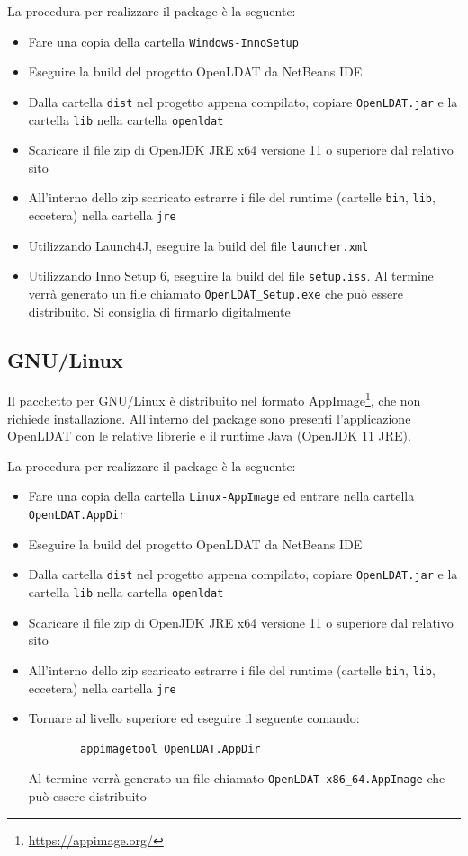 La procedura per realizzare il package è la seguente:\begin{itemize}
	\item Fare una copia della cartella \texttt{Windows-InnoSetup}
	\item Eseguire la build del progetto OpenLDAT da NetBeans IDE
	\item Dalla cartella \texttt{dist} nel progetto appena compilato, copiare \texttt{OpenLDAT.jar} e la cartella \texttt{lib} nella cartella \texttt{openldat}
	\item Scaricare il file zip di OpenJDK JRE x64 versione 11 o superiore dal relativo sito
	\item All'interno dello zip scaricato estrarre i file del runtime (cartelle \texttt{bin}, \texttt{lib}, eccetera) nella cartella \texttt{jre}
	\item Utilizzando Launch4J, eseguire la build del file \texttt{launcher.xml}
	\item Utilizzando Inno Setup 6, eseguire la build del file \texttt{setup.iss}. Al termine verrà generato un file chiamato \texttt{OpenLDAT\_Setup.exe} che può essere distribuito. Si consiglia di firmarlo digitalmente
\end{itemize}

\subsection{GNU/Linux}
Il pacchetto per GNU/Linux è distribuito nel formato AppImage\footnote{\href{https://appimage.org/}{https://appimage.org/}}, che non richiede installazione. All'interno del package sono presenti l'applicazione OpenLDAT con le relative librerie e il runtime Java (OpenJDK 11 JRE).

La procedura per realizzare il package è la seguente:\begin{itemize}
	\item Fare una copia della cartella \texttt{Linux-AppImage} ed entrare nella cartella \texttt{OpenLDAT.AppDir}
	\item Eseguire la build del progetto OpenLDAT da NetBeans IDE
	\item Dalla cartella \texttt{dist} nel progetto appena compilato, copiare \texttt{OpenLDAT.jar} e la cartella \texttt{lib} nella cartella \texttt{openldat}
	\item Scaricare il file zip di OpenJDK JRE x64 versione 11 o superiore dal relativo sito
	\item All'interno dello zip scaricato estrarre i file del runtime (cartelle \texttt{bin}, \texttt{lib}, eccetera) nella cartella \texttt{jre}
	\item Tornare al livello superiore ed eseguire il seguente comando:\begin{verbatim}
		appimagetool OpenLDAT.AppDir
	\end{verbatim}
	Al termine verrà generato un file chiamato \texttt{OpenLDAT-x86\_64.AppImage} che può essere distribuito
\end{itemize}


